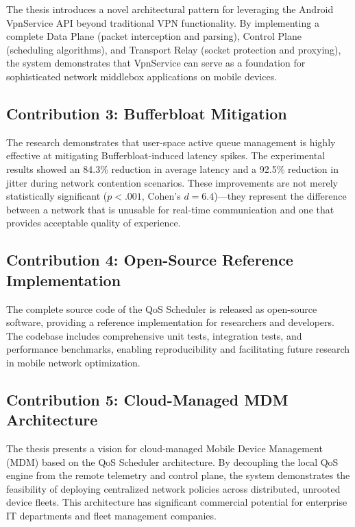 The thesis introduces a novel architectural pattern for leveraging the Android VpnService API beyond traditional VPN functionality. By implementing a complete Data Plane (packet interception and parsing), Control Plane (scheduling algorithms), and Transport Relay (socket protection and proxying), the system demonstrates that VpnService can serve as a foundation for sophisticated network middlebox applications on mobile devices.

\subsection{Contribution 3: Bufferbloat Mitigation}

The research demonstrates that user-space active queue management is highly effective at mitigating Bufferbloat-induced latency spikes. The experimental results showed an 84.3\% reduction in average latency and a 92.5\% reduction in jitter during network contention scenarios. These improvements are not merely statistically significant ($p < .001$, Cohen's $d = 6.4$)---they represent the difference between a network that is unusable for real-time communication and one that provides acceptable quality of experience.

\subsection{Contribution 4: Open-Source Reference Implementation}

The complete source code of the QoS Scheduler is released as open-source software, providing a reference implementation for researchers and developers. The codebase includes comprehensive unit tests, integration tests, and performance benchmarks, enabling reproducibility and facilitating future research in mobile network optimization.

\subsection{Contribution 5: Cloud-Managed MDM Architecture}

The thesis presents a vision for cloud-managed Mobile Device Management (MDM) based on the QoS Scheduler architecture. By decoupling the local QoS engine from the remote telemetry and control plane, the system demonstrates the feasibility of deploying centralized network policies across distributed, unrooted device fleets. This architecture has significant commercial potential for enterprise IT departments and fleet management companies.

